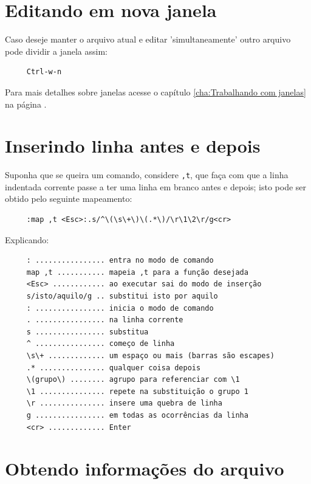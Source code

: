 \documentclass[10pt,a4paper,openany]{book}
\begin{document}
\section{Editando em nova janela}\label{Editando em nova janela}

Caso deseje manter o arquivo atual e editar 'simultaneamente' outro arquivo
pode dividir a janela assim:

\begin{verbatim}
     Ctrl-w-n
\end{verbatim}

Para mais detalhes sobre janelas acesse o capítulo
\ref{cha:Trabalhando com janelas} na página \pageref{cha:Trabalhando
com janelas}.


\section{Inserindo linha antes e depois}

Suponha que se queira um comando, considere \verb|,t|, que faça com que a
linha indentada corrente passe a ter uma linha em branco antes e depois; isto
pode ser obtido pelo seguinte mapeamento:

\begin{verbatim}
     :map ,t <Esc>:.s/^\(\s\+\)\(.*\)/\r\1\2\r/g<cr>
\end{verbatim}
     
Explicando:
     
\begin{verbatim}
     : ................ entra no modo de comando
     map ,t ........... mapeia ,t para a função desejada
     <Esc> ............ ao executar sai do modo de inserção
     s/isto/aquilo/g .. substitui isto por aquilo
     : ................ inicia o modo de comando
     . ................ na linha corrente
     s ................ substitua
     ^ ................ começo de linha
     \s\+ ............. um espaço ou mais (barras são escapes)
     .* ............... qualquer coisa depois
     \(grupo\) ........ agrupo para referenciar com \1
     \1 ............... repete na substituição o grupo 1
     \r ............... insere uma quebra de linha
     g ................ em todas as ocorrências da linha
     <cr> ............. Enter
\end{verbatim}

\section{Obtendo informações do arquivo}
\end{document}
